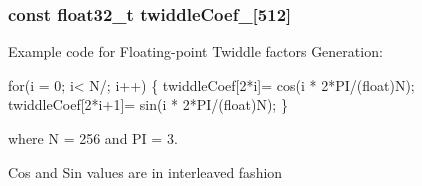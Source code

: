 \subsubsection[{\texorpdfstring{twiddle\+Coef\+\_\+256}{twiddleCoef_256}}]{\setlength{\rightskip}{0pt plus 5cm}const float32\+\_\+t twiddle\+Coef\+\_\mbox{[}512\mbox{]}}\hypertarget{group__CFFT__CIFFT_gafe813758a03a798e972359a092315be4}{}\label{group__CFFT__CIFFT_gafe813758a03a798e972359a092315be4}
\begin{DoxyParagraph}{}
Example code for Floating-\/point Twiddle factors Generation\+: 
\end{DoxyParagraph}
\begin{DoxyParagraph}{}

\begin{DoxyPre}for(i = 0; i< N/; i++)
\{
  twiddleCoef[2*i]= cos(i * 2*PI/(float)N);
  twiddleCoef[2*i+1]= sin(i * 2*PI/(float)N);
\} \end{DoxyPre}
 
\end{DoxyParagraph}
\begin{DoxyParagraph}{}
where N = 256 and PI = 3. 
\end{DoxyParagraph}
\begin{DoxyParagraph}{}
Cos and Sin values are in interleaved fashion 
\end{DoxyParagraph}
